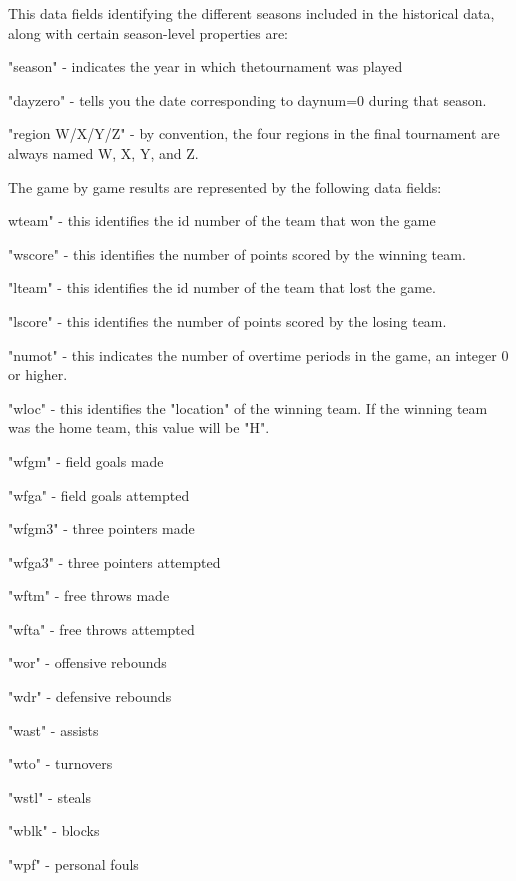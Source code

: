 \documentclass{article}
\begin{document}
\begin{multicols}{2}
	This data fields identifying the different seasons included in the historical data, along with certain season-level properties are:

\begin{list}{Field}{}
\item 
"season" - indicates the year in which thetournament was played
\item
"dayzero" - tells you the date corresponding to daynum=0 during that season. 
\item
"region W/X/Y/Z" - by convention, the four regions in the final tournament are always named W, X, Y, and Z.
\end{list}

	The game by game results are represented by the following data fields:
\begin{list}{Field}{}
\item
wteam" - this identifies the id number of the team that won the game
\item
"wscore" - this identifies the number of points scored by the winning team.
\item
"lteam" - this identifies the id number of the team that lost the game.
\item
"lscore" - this identifies the number of points scored by the losing team.
\item
"numot" - this indicates the number of overtime periods in the game, an integer 0 or higher.
\item
"wloc" - this identifies the "location" of the winning team. If the winning team was the home team, this value will be "H".
\item
"wfgm" - field goals made
\item
"wfga" - field goals attempted
\item
"wfgm3" - three pointers made
\item
"wfga3" - three pointers attempted
\item
"wftm" - free throws made
\item
"wfta" - free throws attempted
\item
"wor" - offensive rebounds
\item
"wdr" - defensive rebounds
\item
"wast" - assists
\item
"wto" - turnovers
\item
"wstl" - steals
\item
"wblk" - blocks
\item
"wpf" - personal fouls
\item

\end{list}
\end{multicols}
\end{document}
